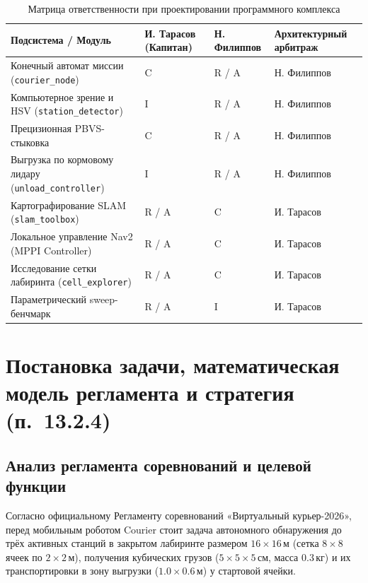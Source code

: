 \documentclass[a4paper,11pt]{article}
\begin{document}
\begin{table}[H]
\centering
\small
\begin{tabularx}{\textwidth}{X>{\centering\arraybackslash}p{3.5cm}>{\centering\arraybackslash}p{3.5cm}>{\centering\arraybackslash}p{4.2cm}}
\toprule
\textbf{Подсистема / Модуль} & \textbf{И. Тарасов (Капитан)} & \textbf{Н. Филиппов} & \textbf{Архитектурный арбитраж} \\
\midrule
Конечный автомат миссии (\texttt{courier\_node}) & C & R / A & Н. Филиппов \\
Компьютерное зрение и HSV (\texttt{station\_detector}) & I & R / A & Н. Филиппов \\
Прецизионная PBVS-стыковка & C & R / A & Н. Филиппов \\
Выгрузка по кормовому лидару (\texttt{unload\_controller}) & I & R / A & Н. Филиппов \\
Картографирование SLAM (\texttt{slam\_toolbox}) & R / A & C & И. Тарасов \\
Локальное управление Nav2 (MPPI Controller) & R / A & C & И. Тарасов \\
Исследование сетки лабиринта (\texttt{cell\_explorer}) & R / A & C & И. Тарасов \\
Параметрический sweep-бенчмарк & R / A & I & И. Тарасов \\
\bottomrule
\end{tabularx}
\caption{Матрица ответственности при проектировании программного комплекса}
\label{tab:raci}
\end{table}

\section{Постановка задачи, математическая модель регламента и стратегия (п.~13.2.4)}

\subsection{Анализ регламента соревнований и целевой функции}
Согласно официальному Регламенту соревнований «Виртуальный курьер-2026», перед мобильным роботом Courier стоит задача автономного обнаружения до трёх активных станций в закрытом лабиринте размером $16 \times 16$\,м (сетка $8 \times 8$ ячеек по $2 \times 2$\,м), получения кубических грузов ($5 \times 5 \times 5$\,см, масса $0.3$\,кг) и их транспортировки в зону выгрузки ($1.0 \times 0.6$\,м) у стартовой ячейки.
\end{document}
